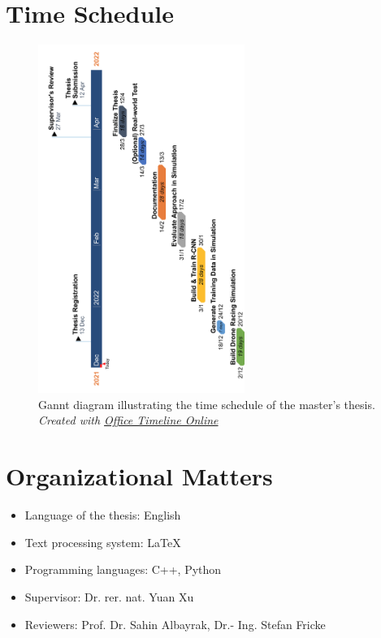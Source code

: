 	
\chapter{Time Schedule}

\begin{figure}[H]
    \centering
    \includegraphics[width=0.6\textwidth]{figures/Timeline.png}
    \caption[Gannt diagram illustrating the time schedule of the master's thesis.]{Gannt diagram illustrating the time schedule of the master's thesis. \textit{Created with \href{https://online.officetimeline.com/}{Office Timeline Online}}}
    \label{fig:Timeline}
\end{figure}

\chapter{Organizational Matters}
\begin{itemize}
	\item Language of the thesis: English
	\item Text processing system: LaTeX
	\item Programming languages: C++, Python
	\item Supervisor: Dr. rer. nat. Yuan Xu
	\item Reviewers: Prof. Dr. Sahin Albayrak, Dr.- Ing. Stefan Fricke
\end{itemize}


